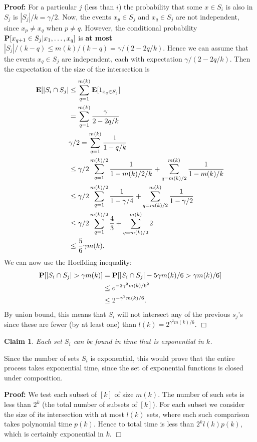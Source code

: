 \documentclass[11pt]{article} \usepackage{amssymb}
\newtheorem{claim}[theorem]{Claim}
\newenvironment{proof}{\noindent \textbf{Proof:}}{$\Box$}
\newcommand{\E}{{\bf E}} \newcommand{\Cov}{{\bf Cov}}
\begin{document}
\begin{enumerate}
\begin{proof}
For a particular $j$ (less than $i$) the probability that some $x\in S_i$ is also
in $S_j$ is $|S_j|/k=\gamma /2$. Now, the events $x_p\in S_j$ and $x_q\in S_j$ are 
not independent, since $x_p\neq x_q$ when $p \neq q$. However, the conditional 
probability 
$\P[x_{q+1}\in S_j|x_1,\ldots,x_q]$ is {\bf at most} 
$|S_j|/(k-q)\leq m(k)/(k-q)=\gamma /(2-2q/k)$. Hence we can assume that the
events $x_q\in S_j$ are independent, each with expectation $\gamma /(2-2q/k)$.
Then the expectation of the size of the intersection is
\begin{align*}
  \E[|S_i \cap S_j| &\leq \sum_{q=1}^{m(k)} \E[1_{x_q\in S_j}]
\\  &=\sum_{q=1}^{m(k)}{\gamma \over 2 - 2q/k}
\\  &\gamma/2=\sum_{q=1}^{m(k)}{1 \over 1 - q/k}
\\  &\leq \gamma/2\sum_{q=1}^{m(k)/2}{1 \over 1 - m(k)/2/k}+\sum_{q=m(k)/2}^{m(k)}{1 \over 1 - m(k)/k}
\\  &\leq \gamma/2\sum_{q=1}^{m(k)/2}{1 \over 1 - \gamma/4}+\sum_{q=m(k)/2}^{m(k)}{1 \over 1 - \gamma/2}
\\  &\leq \gamma/2\sum_{q=1}^{m(k)/2}{4 \over 3}+\sum_{q=m(k)/2}^{m(k)}2
\\  &\leq {5\over 6}\gamma m(k).
\end{align*}
We can now use the Hoeffding inequality:
\begin{align*}
  \P[|S_i\cap S_j|>\gamma m(k)] &= \P[|S_i\cap S_j|- 5\gamma m(k)/6>\gamma m(k)/6]
  \\ &\leq e^{-2\gamma^2 m(k)/6^2}
  \\ &\leq 2^{-\gamma^2 m(k)/6}.
\end{align*}
By union bound, this means that $S_i$ will not intersect any of the previous
$s_j$'s since these are fewer (by at least one) than 
$l(k)=2^{\gamma^2 m(k)/6}$. 
\end{proof}

\begin{claim}
Each set $S_i$ can be found in time that is exponential in $k$.  
\end{claim}
Since the number of sets $S_i$ is exponential, this would prove that the entire 
process takes exponential time, since the set of exponential functions is 
closed under composition.

\begin{proof}
  We test each subset of  $[k]$ of size $m(k)$. The number of such sets is less 
than $2^k$ (the total number of subsets of $[k]$). For each subset we consider
the size of its intersection with at most $l(k)$ sets, where each such 
comparison takes polynomial time $p(k)$. Hence to total time is less than 
$2^kl(k)p(k)$, which is certainly exponential in $k$.
\end{proof}



\end{enumerate}
\end{document}
